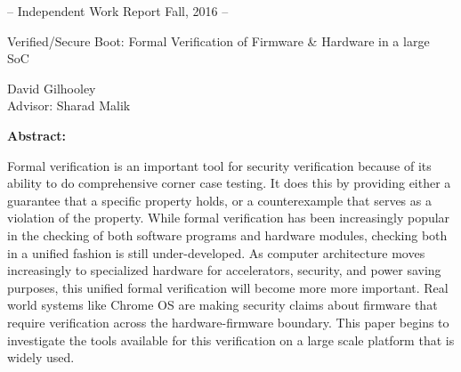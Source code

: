 \begin{center}
    \small{-- Independent Work Report Fall, 2016 --}
\end{center}

\vspace{1in}

\begin{center}
    \huge{Verified/Secure Boot: Formal Verification of Firmware \& Hardware in a large SoC} \\
\end{center}

\vspace{1in}

\begin{center}
    \Large{David Gilhooley} \\
    \vspace{0.1in}
    \large{Advisor: Sharad Malik} \\
\end{center}

\vspace{1in}

 \begin{center}
     \textbf{Abstract:}
 \end{center}

 \onehalfspacing
 Formal verification is an important tool for security verification because of its ability to do comprehensive corner case testing.
 It does this by providing either a guarantee that a specific property holds, or a counterexample that serves as a violation of the property.
 While formal verification has been increasingly popular in the checking of both software programs and hardware modules, checking both in a unified fashion is still under-developed.
 As computer architecture moves increasingly to specialized hardware for accelerators, security, and power saving purposes, this unified formal verification will become more more important.
 Real world systems like Chrome OS are making security claims about firmware that require verification across the hardware-firmware boundary. 
 This paper begins to investigate the tools available for this verification on a large scale platform that is widely used.



\thispagestyle{empty}
